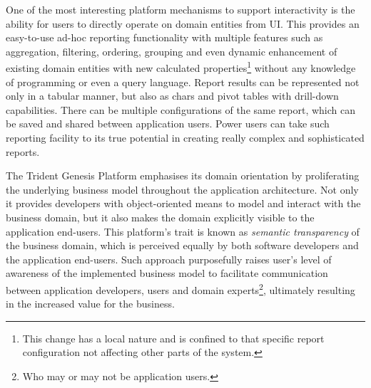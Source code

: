   One of the most interesting platform mechanisms to support interactivity is the ability for users to directly operate on domain entities from UI.
  This provides an easy-to-use ad-hoc reporting functionality with multiple features such as aggregation, filtering, ordering, grouping and even dynamic enhancement of existing domain entities with new calculated properties\footnote{This change has a local nature and is confined to that specific report configuration not affecting other parts of the system.} without any knowledge of programming or even a query language.
  Report results can be represented not only in a tabular manner, but also as chars and pivot tables with drill-down capabilities.
  There can be multiple configurations of the same report, which can be saved and shared between application users.
  Power users can take such reporting facility to its true potential in creating really complex and sophisticated reports.

  The Trident Genesis Platform emphasises its domain orientation by proliferating the underlying business model throughout the application architecture.
  Not only it provides developers with object-oriented means to model and interact with the business domain, but it also makes the domain explicitly visible to the application end-users.
  This platform's trait is known as \emph{semantic transparency} of the business domain, which is perceived equally by both software developers and the application end-users.
  Such approach purposefully raises user's level of awareness of the implemented business model to facilitate communication between application developers, users and domain experts\footnote{Who may or may not be application users.}, ultimately resulting in the increased value for the business.